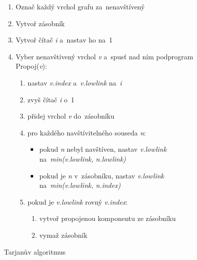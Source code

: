 \begin{figure}[htbp]
\begin{minipage}{0.45\textwidth}
\begin{enumerate}
            \item Označ každý vrchol grafu za~nenavštívený
            \item Vytvoř zásobník
            \item Vytvoř čítač \emph{i} a~nastav ho na~1
            \item Vyber nenavštívený vrchol \emph{v} a~spusť nad ním podprogram Propoj(\emph{v}):
                  \begin{enumerate}
                      \item nastav \emph{v.index} a~\emph{v.lowlink} na~\emph{i}
                      \item zvyš čítač \emph{i} o~1
                      \item přidej vrchol \emph{v} do~zásobníku
                      \item pro každého navštívitelného souseda \emph{n}:
                            \begin{itemize}
                                \item pokud \emph{n} nebyl navštíven, nastav \emph{v.lowlink} na~\emph{min(v.lowlink, n.lowlink)}
                                \item pokud je \emph{n} v~zásobníku, nastav \emph{v.lowlink} na~\emph{min(v.lowlink, n.index)}
                            \end{itemize}
                      \item pokud je \emph{v.lowlink} rovný \emph{v.index}:
                            \begin{enumerate}
                                \item vytvoř propojenou komponentu ze zásobníku
                                \item vymaž zásobník
                            \end{enumerate}
                  \end{enumerate}
        \end{enumerate}
        \caption{Tarjanův algoritmus}
        \label{fig:tarjan}
    \end{minipage}
\end{figure}
\FloatBarrier


